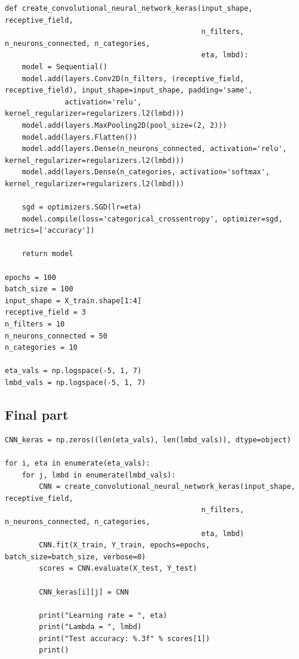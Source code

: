 \documentclass[%
oneside,                 %
final,                   %
10pt]{article}
\begin{document}
\begin{verbatim}
def create_convolutional_neural_network_keras(input_shape, receptive_field,
                                              n_filters, n_neurons_connected, n_categories,
                                              eta, lmbd):
    model = Sequential()
    model.add(layers.Conv2D(n_filters, (receptive_field, receptive_field), input_shape=input_shape, padding='same',
              activation='relu', kernel_regularizer=regularizers.l2(lmbd)))
    model.add(layers.MaxPooling2D(pool_size=(2, 2)))
    model.add(layers.Flatten())
    model.add(layers.Dense(n_neurons_connected, activation='relu', kernel_regularizer=regularizers.l2(lmbd)))
    model.add(layers.Dense(n_categories, activation='softmax', kernel_regularizer=regularizers.l2(lmbd)))
    
    sgd = optimizers.SGD(lr=eta)
    model.compile(loss='categorical_crossentropy', optimizer=sgd, metrics=['accuracy'])
    
    return model

epochs = 100
batch_size = 100
input_shape = X_train.shape[1:4]
receptive_field = 3
n_filters = 10
n_neurons_connected = 50
n_categories = 10

eta_vals = np.logspace(-5, 1, 7)
lmbd_vals = np.logspace(-5, 1, 7)

\end{verbatim}


\subsection{Final part}


















\begin{verbatim}
CNN_keras = np.zeros((len(eta_vals), len(lmbd_vals)), dtype=object)
        
for i, eta in enumerate(eta_vals):
    for j, lmbd in enumerate(lmbd_vals):
        CNN = create_convolutional_neural_network_keras(input_shape, receptive_field,
                                              n_filters, n_neurons_connected, n_categories,
                                              eta, lmbd)
        CNN.fit(X_train, Y_train, epochs=epochs, batch_size=batch_size, verbose=0)
        scores = CNN.evaluate(X_test, Y_test)
        
        CNN_keras[i][j] = CNN
        
        print("Learning rate = ", eta)
        print("Lambda = ", lmbd)
        print("Test accuracy: %.3f" % scores[1])
        print()

\end{verbatim}
\end{document}
